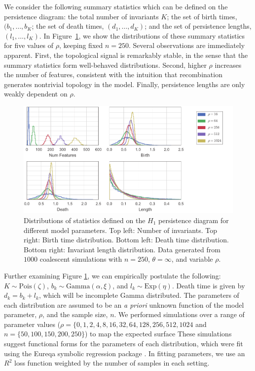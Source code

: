 We consider the following summary statistics which can be defined on the persistence diagram: the total number of invariants $K$; the set of birth times, $(b_1,{\ldots},b_K$; the set of death times, $(d_1,{\ldots},d_K)$; and the set of persistence lengths, $(l_1,{\ldots},l_K)$.
In Figure~\ref{fig:coalescent_sims_fig1}, we show the distributions of these summary statistics for five values of $\rho$, keeping fixed $n=250$.
Several observations are immediately apparent.
First, the topological signal is remarkably stable, in the sense that the summary statistics form well-behaved distributions.
Second, higher $\rho$ increases the number of features, consistent with the intuition that recombination generates nontrivial topology in the model.
Finally, persistence lengths are only weakly dependent on $\rho$.

\begin{figure}
\begin{center}
\centerline{\includegraphics[width=\columnwidth]{./fig/parametric_inference/coalescent_sims_fig1.pdf}}
\caption[Distributions of statistics defined on the $H_1$ persistence diagram for different model parameters]{Distributions of statistics defined on the $H_1$ persistence diagram for different model parameters. Top left: Number of invariants. Top right: Birth time distribution. Bottom left: Death time distribution. Bottom right: Invariant length distribution. Data generated from $1000$ coalescent simulations with $n=250$, $\theta=\infty$, and variable $\rho$.}
\label{fig:coalescent_sims_fig1}
\end{center}
\end{figure}

Further examining Figure \ref{fig:coalescent_sims_fig1}, we can empirically postulate the following: $K \sim \mathrm{Pois}(\zeta)$, $b_k \sim \mathrm{Gamma}(\alpha,\xi)$, and $l_k \sim \mathrm{Exp}(\eta)$.
Death time is given by $d_k=b_k+l_k$, which will be incomplete Gamma distributed.
The parameters of each distribution are assumed to be an \emph{a priori} unknown function of the model parameter, $\rho$, and the sample size, $n$.
We performed simulations over a range of parameter values ($\rho=\{0, 1, 2, 4, 8, 16, 32, 64, 128, 256, 512, 1024$ and $n=\{50, 100, 150, 200, 250\}$) to map the expected surface
These simulations suggest functional forms for the parameters of each distribution, which were fit using the Eureqa symbolic regression package \cite{Eureqa}.
In fitting parameters, we use an $R^2$ loss function weighted by the number of samples in each setting.


